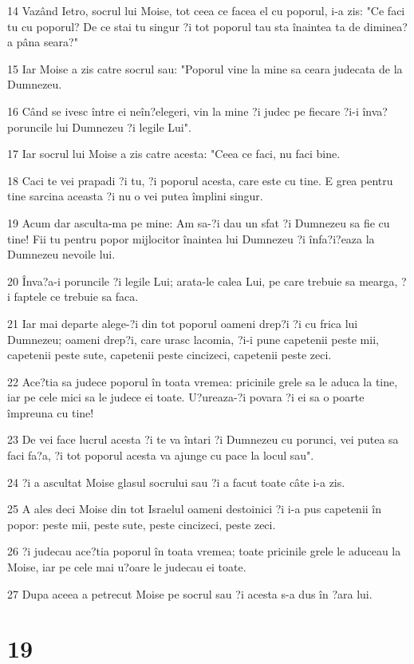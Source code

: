 \par 14 Vazând Ietro, socrul lui Moise, tot ceea ce facea el cu poporul, i-a zis: "Ce faci tu cu poporul? De ce stai tu singur ?i tot poporul tau sta înaintea ta de diminea?a pâna seara?"
\par 15 Iar Moise a zis catre socrul sau: "Poporul vine la mine sa ceara judecata de la Dumnezeu.
\par 16 Când se ivesc între ei neîn?elegeri, vin la mine ?i judec pe fiecare ?i-i înva? poruncile lui Dumnezeu ?i legile Lui".
\par 17 Iar socrul lui Moise a zis catre acesta: "Ceea ce faci, nu faci bine.
\par 18 Caci te vei prapadi ?i tu, ?i poporul acesta, care este cu tine. E grea pentru tine sarcina aceasta ?i nu o vei putea împlini singur.
\par 19 Acum dar asculta-ma pe mine: Am sa-?i dau un sfat ?i Dumnezeu sa fie cu tine! Fii tu pentru popor mijlocitor înaintea lui Dumnezeu ?i înfa?i?eaza la Dumnezeu nevoile lui.
\par 20 Înva?a-i poruncile ?i legile Lui; arata-le calea Lui, pe care trebuie sa mearga, ?i faptele ce trebuie sa faca.
\par 21 Iar mai departe alege-?i din tot poporul oameni drep?i ?i cu frica lui Dumnezeu; oameni drep?i, care urasc lacomia, ?i-i pune capetenii peste mii, capetenii peste sute, capetenii peste cincizeci, capetenii peste zeci.
\par 22 Ace?tia sa judece poporul în toata vremea: pricinile grele sa le aduca la tine, iar pe cele mici sa le judece ei toate. U?ureaza-?i povara ?i ei sa o poarte împreuna cu tine!
\par 23 De vei face lucrul acesta ?i te va întari ?i Dumnezeu cu porunci, vei putea sa faci fa?a, ?i tot poporul acesta va ajunge cu pace la locul sau".
\par 24 ?i a ascultat Moise glasul socrului sau ?i a facut toate câte i-a zis.
\par 25 A ales deci Moise din tot Israelul oameni destoinici ?i i-a pus capetenii în popor: peste mii, peste sute, peste cincizeci, peste zeci.
\par 26 ?i judecau ace?tia poporul în toata vremea; toate pricinile grele le aduceau la Moise, iar pe cele mai u?oare le judecau ei toate.
\par 27 Dupa aceea a petrecut Moise pe socrul sau ?i acesta s-a dus în ?ara lui.

\chapter{19}

